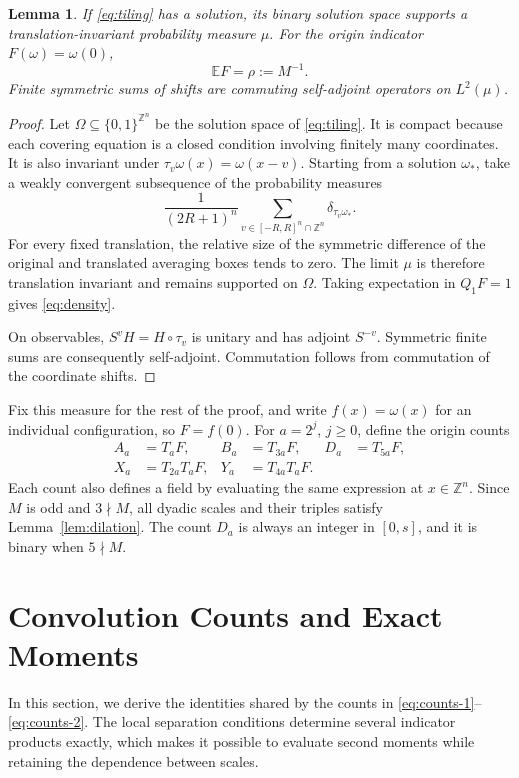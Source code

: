 \documentclass[12pt,letterpaper,onecolumn]{article}
\newtheorem{lemma}[theorem]{Lemma}
\theoremstyle{definition}
\newcommand{\Z}{\mathbb{Z}}
\newcommand{\E}{\mathbb{E}}
\begin{document}
\begin{lemma}\label{lem:stationary}
If \eqref{eq:tiling} has a solution, its binary solution space supports a translation-invariant probability measure $\mu$. For the origin indicator $F(\omega)=\omega(0)$,
\begin{equation}\label{eq:density}
 \E F=\rho:=M^{-1}.
\end{equation}
Finite symmetric sums of shifts are commuting self-adjoint operators on $L^2(\mu)$.
\end{lemma}
\begin{proof}
Let $\Omega\subseteq\{0,1\}^{\Z^n}$ be the solution space of \eqref{eq:tiling}. It is compact because each covering equation is a closed condition involving finitely many coordinates. It is also invariant under $\tau_v\omega(x)=\omega(x-v)$. Starting from a solution $\omega_*$, take a weakly convergent subsequence of the probability measures
\begin{equation}\label{eq:spatial-average}
 \frac{1}{(2R+1)^n}
 \sum_{v\in[-R,R]^n\cap\Z^n}\delta_{\tau_v\omega_*}.
\end{equation}
For every fixed translation, the relative size of the symmetric difference of the original and translated averaging boxes tends to zero. The limit $\mu$ is therefore translation invariant and remains supported on $\Omega$. Taking expectation in $Q_1F=1$ gives \eqref{eq:density}.

On observables, $S^vH=H\circ\tau_v$ is unitary and has adjoint $S^{-v}$. Symmetric finite sums are consequently self-adjoint. Commutation follows from commutation of the coordinate shifts.
\end{proof}

Fix this measure for the rest of the proof, and write $f(x)=\omega(x)$ for an individual configuration, so $F=f(0)$. For $a=2^j$, $j\ge0$, define the origin counts
\begin{align}
 A_a&=T_aF,& B_a&=T_{3a}F,&D_a&=T_{5a}F,\label{eq:counts-1}\\
 X_a&=T_{2a}T_aF,&Y_a&=T_{4a}T_aF.&&\label{eq:counts-2}
\end{align}
Each count also defines a field by evaluating the same expression at $x\in\Z^n$. Since $M$ is odd and $3\nmid M$, all dyadic scales and their triples satisfy Lemma~\ref{lem:dilation}. The count $D_a$ is always an integer in $[0,s]$, and it is binary when $5\nmid M$.

 \section{Convolution Counts and Exact Moments}\label{sec:moments}
In this section, we derive the identities shared by the counts in \eqref{eq:counts-1}--\eqref{eq:counts-2}. The local separation conditions determine several indicator products exactly, which makes it possible to evaluate second moments while retaining the dependence between scales.
\end{document}
